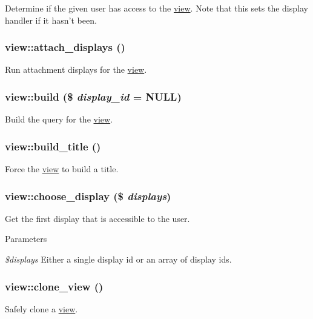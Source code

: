 Determine if the given user has access to the \hyperlink{classview}{view}. Note that this sets the display handler if it hasn't been. \hypertarget{classview_a39447f6a3f0456b0a2e75799c074e453}{
\subsubsection[{attach\_\-displays}]{\setlength{\rightskip}{0pt plus 5cm}view::attach\_\-displays ()}}
\label{classview_a39447f6a3f0456b0a2e75799c074e453}
Run attachment displays for the \hyperlink{classview}{view}. \hypertarget{classview_ae6c1bacf2c29c0b2b0f641c4768f2f44}{
\subsubsection[{build}]{\setlength{\rightskip}{0pt plus 5cm}view::build (\$ {\em display\_\-id} = {\ttfamily NULL})}}
\label{classview_ae6c1bacf2c29c0b2b0f641c4768f2f44}
Build the query for the \hyperlink{classview}{view}. \hypertarget{classview_a15a2dddb480ab44af4a093579a544501}{
\subsubsection[{build\_\-title}]{\setlength{\rightskip}{0pt plus 5cm}view::build\_\-title ()}}
\label{classview_a15a2dddb480ab44af4a093579a544501}
Force the \hyperlink{classview}{view} to build a title. \hypertarget{classview_a66ba9a9554f6f5fc3e2ee54e448b6f32}{
\subsubsection[{choose\_\-display}]{\setlength{\rightskip}{0pt plus 5cm}view::choose\_\-display (\$ {\em displays})}}
\label{classview_a66ba9a9554f6f5fc3e2ee54e448b6f32}
Get the first display that is accessible to the user.


\begin{DoxyParams}{Parameters}
\item[{\em \$displays}]Either a single display id or an array of display ids. \end{DoxyParams}
\hypertarget{classview_ad9f19580a578b9e05c7f353090668a99}{
\subsubsection[{clone\_\-view}]{\setlength{\rightskip}{0pt plus 5cm}view::clone\_\-view ()}}
\label{classview_ad9f19580a578b9e05c7f353090668a99}
Safely clone a \hyperlink{classview}{view}.

